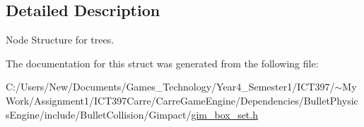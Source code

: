 \subsection{Detailed Description}
Node Structure for trees. 

The documentation for this struct was generated from the following file:\begin{CompactItemize}
\item 
C:/Users/New/Documents/Games\_\-Technology/Year4\_\-Semester1/ICT397/$\sim$My Work/Assignment1/ICT397Carre/CarreGameEngine/Dependencies/BulletPhysicsEngine/include/BulletCollision/Gimpact/\hyperlink{gim__box__set_8h}{gim\_\-box\_\-set.h}\end{CompactItemize}
